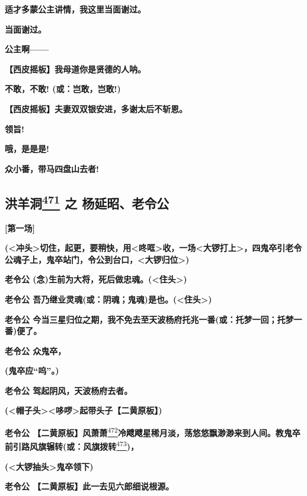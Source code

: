 \textbf{适才多蒙公主讲情，我这里当面谢过。}

\textbf{当面谢过。}

\textbf{公主啊------}

\textbf{【西皮摇板】我母道你是贤德的人呐。}

\textbf{不敢，不敢! (或：岂敢，岂敢!)}

\textbf{【西皮摇板】夫妻双双银安进，多谢太后不斩恩。}

\textbf{领旨!}

\textbf{哦，是是是!}

\textbf{众小番，带马四盘山去者!}

\hypertarget{ux6d2aux7f8aux6d1e-ux4e4b-ux6768ux5ef6ux662dux8001ux4ee4ux516c}{%
\subsection{\texorpdfstring{洪羊洞\protect\hyperlink{fn471}{\textsuperscript{471}}
之
杨延昭、老令公}{洪羊洞471 之 杨延昭、老令公}}\label{ux6d2aux7f8aux6d1e-ux4e4b-ux6768ux5ef6ux662dux8001ux4ee4ux516c}}

\textbf{{[}第一场{]}}

\textbf{(\textless{}冲头\textgreater{}切住，起更，要稍快，用\textless{}咚哐\textgreater{}收，一场\textless{}大锣打上\textgreater{}，四鬼卒引老令公魂子上，鬼卒站门，令公到台口，\textless{}大锣归位\textgreater{})}

\textbf{老令公
(念)生前为大将，死后做忠魂。(\textless{}住头\textgreater{})}

\textbf{老令公
吾乃继业灵魂(或：阴魂；鬼魂)是也。(\textless{}住头\textgreater{})}

\textbf{老令公
今当三星归位之期，我不免去至天波杨府托兆一番(或：托梦一回；托梦一番)便了。}

\textbf{老令公 众鬼卒，}

\textbf{(鬼卒应``呜''。)}

\textbf{老令公 驾起阴风，天波杨府去者。}

\textbf{(\textless{}帽子头\textgreater{}\textless{}哆啰\textgreater{}起带头子【二黄原板】)}

\textbf{老令公
【二黄原板】风萧萧}\protect\hyperlink{fn472}{\textsuperscript{472}}\textbf{冷飕飕星稀月淡，荡悠悠飘渺渺来到人间。教鬼卒前引路风旗辗转(或：风旗拨转}\protect\hyperlink{fn473}{\textsuperscript{473}}\textbf{)，}

\textbf{(\textless{}大锣抽头\textgreater{}鬼卒领下)}

\textbf{老令公 【二黄原板】此一去见六郎细说根源。}

